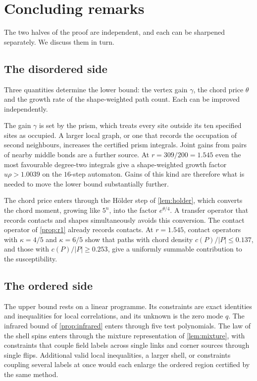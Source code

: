 \section{Concluding remarks}\label{sec:discussion}

The two halves of the proof are independent, and each can be sharpened separately. We discuss them in turn.

\subsection{The disordered side}

Three quantities determine the lower bound: the vertex gain $\gamma$, the chord price $\theta$ and the growth rate of the shape-weighted path count. Each can be improved independently.

The gain $\gamma$ is set by the prism, which treats every site outside its ten specified sites as occupied. A larger local graph, or one that records the occupation of second neighbours, increases the certified prism integrals. Joint gains from pairs of nearby middle bonds are a further source. At $r=309/200=1.545$ even the most favourable degree-two integrals give a shape-weighted growth factor $u\rho>1.0039$ on the $16$-step automaton. Gains of this kind are therefore what is needed to move the lower bound substantially further.

The chord price enters through the H\"older step of \cref{lem:holder}, which converts the chord moment, growing like $5^n$, into the factor $e^{\theta/4}$. A transfer operator that records contacts and shapes simultaneously avoids this conversion. The contact operator of \cref{prop:r1} already records contacts. At $r=1.545$, contact operators with $\kappa=4/5$ and $\kappa=6/5$ show that paths with chord density $c(P)/|P|\le0.137$, and those with $c(P)/|P|\ge0.253$, give a uniformly summable contribution to the susceptibility.

\subsection{The ordered side}

The upper bound rests on a linear programme. Its constraints are exact identities and inequalities for local correlations, and its unknown is the zero mode $q$. The infrared bound of \cref{prop:infrared} enters through five test polynomials. The law of the shell spins enters through the mixture representation of \cref{lem:mixture}, with constraints that couple field labels across single links and corner sources through single flips. Additional valid local inequalities, a larger shell, or constraints coupling several labels at once would each enlarge the ordered region certified by the same method.
